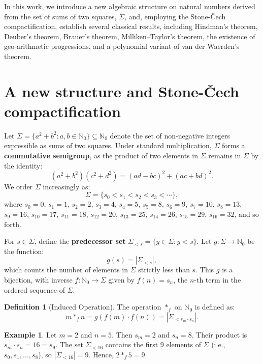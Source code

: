 \documentclass[12pt]{amsart}
\theoremstyle{plain}
\theoremstyle{definition}
\newtheorem{definition}[theorem]{Definition}
\newtheorem{example}[theorem]{Example}
\theoremstyle{remark}
\numberwithin{equation}{section}
\begin{document}
In this work, we introduce a new algebraic structure on natural numbers derived from the set of sums of two squares, $\Sigma$, and, employing the Stone-\v{C}ech compactification, establish several classical results, including Hindman's theorem, Deuber's theorem, Brauer's theorem, Milliken--Taylor's theorem, the existence of geo-arithmetic progressions, and a polynomial variant of van der Waerden's theorem.

\section{A new structure and  Stone-\v{C}ech compactification} 

Let \(\Sigma = \{a^2 + b^2 : a, b \in \mathbb{N}_0\} \subseteq \mathbb{N}_0\) denote the set of non-negative integers expressible as sums of two squares. Under standard multiplication, \(\Sigma\) forms a \textbf{commutative semigroup}, as the product of two elements in \(\Sigma\) remains in \(\Sigma\) by the identity:
\[
(a^2 + b^2)(c^2 + d^2) = (ad - bc)^2 + (ac + bd)^2.
\]
We order \(\Sigma\) increasingly as:
\[
\Sigma = \{s_0 < s_1 < s_2 < s_3 < \cdots\},
\]
where \(s_0 = 0\), \(s_1 = 1\), \(s_2 = 2\), \(s_3 = 4\), \(s_4 = 5\), \(s_5 = 8\), \(s_6 = 9\), \(s_7 = 10\), \(s_8 = 13\), \(s_9 = 16\), \(s_{10} = 17\), \(s_{11} = 18\), \(s_{12} = 20\), \(s_{13} = 25\), \(s_{14} = 26\), \(s_{15} = 29\), \(s_{16} = 32\), and so forth.

For \(s \in \Sigma\), define the \textbf{predecessor set} \(\Sigma_{<s} = \{y \in \Sigma : y < s\}\). Let \(g: \Sigma \to \mathbb{N}_0\) be the function:
\[
g(s) = \left|\Sigma_{<s}\right|,
\]
which counts the number of elements in \(\Sigma\) strictly less than \(s\). This \(g\) is a bijection, with inverse \(f: \mathbb{N}_0 \to \Sigma\) given by \(f(n) = s_n\), the \(n\)-th term in the ordered sequence of \(\Sigma\).

\begin{definition}[Induced Operation]\label{oper}
The operation \(\ast_f\) on \(\mathbb{N}_0\) is defined as:
\[
m \ast_f n = g(f(m) \cdot f(n)) = \left|\Sigma_{<s_m \cdot s_n}\right|.
\]
\end{definition}

\begin{example}
Let \(m = 2\) and \(n = 5\). Then \(s_m = 2\) and \(s_n = 8\). Their product is \(s_m \cdot s_n = 16 = s_9\). The set \(\Sigma_{<16}\) contains the first 9 elements of \(\Sigma\) (i.e., \(s_0, s_1, \ldots, s_8\)), so \(\left|\Sigma_{<16}\right| = 9\). Hence, \(2 \ast_f 5 = 9\).
\end{example}
\end{document}
